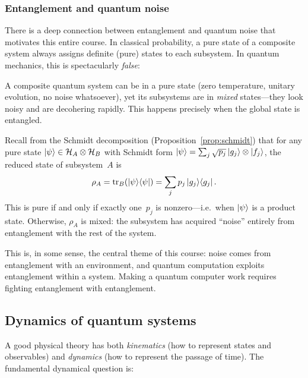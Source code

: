 \subsubsection{Entanglement and quantum noise}

There is a deep connection between entanglement and quantum noise that
motivates this entire course.  In classical probability, a pure state
of a composite system always assigns definite (pure) states to each
subsystem.  In quantum mechanics, this is spectacularly \emph{false}:

\begin{keyresult}
  A composite quantum system can be in a pure state (zero temperature,
  unitary evolution, no noise whatsoever), yet its subsystems are in
  \emph{mixed} states---they look noisy and are decohering rapidly.
  This happens precisely when the global state is entangled.
\end{keyresult}

Recall from the Schmidt decomposition (Proposition~\ref{prop:schmidt})
that for any pure state $\lvert \psi \rangle \in \mathcal{H}_A \otimes \mathcal{H}_B$ with
Schmidt form $\lvert \psi \rangle = \sum_j \sqrt{p_j}\,\lvert g_j \rangle\otimes\lvert f_j \rangle$,
the reduced state of subsystem~$A$ is
\begin{equation}\label{eq:reduced-from-schmidt}
  \rho_A = \operatorname{tr}_B(\lvert \psi \rangle\langle \psi \rvert)
         = \sum_j p_j\,\lvert g_j \rangle\langle g_j \rvert\,.
\end{equation}
This is pure if and only if exactly one~$p_j$ is nonzero---i.e.\ when
$\lvert \psi \rangle$ is a product state.  Otherwise, $\rho_A$ is mixed:
the subsystem has acquired ``noise'' entirely from entanglement with
the rest of the system.

This is, in some sense, the central theme of this course: noise comes
from entanglement with an environment, and quantum computation exploits
entanglement within a system.  Making a quantum computer work requires
fighting entanglement with entanglement.

\subsection{Dynamics of quantum systems}\label{sec:dynamics}

A good physical theory has both \emph{kinematics} (how to represent
states and observables) and \emph{dynamics} (how to represent the
passage of time).  The fundamental dynamical question is:

